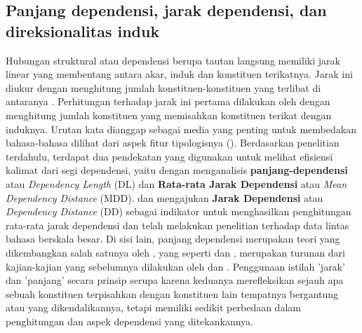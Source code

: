\subsection{Panjang dependensi, jarak dependensi, dan direksionalitas induk}

Hubungan struktural atau dependensi berupa tautan langsung memiliki jarak linear yang membentang antara akar, induk dan konstituen terikatnya. Jarak ini diukur dengan menghitung jumlah konstituen-konstituen yang terlibat di antaranya \citep{heringer1980syntax}. Perhitungan terhadap jarak ini pertama dilakukan oleh \cite{heringer1980syntax} dengan menghitung jumlah konstituen yang memisahkan konstituen terikat dengan induknya. Urutan kata dianggap sebagai media yang penting untuk membedakan bahasa-bahasa dilihat dari aspek fitur tipologisnya (\citealp{greenberg1963some, dryer1992greenbergian}). Berdasarkan penelitian terdahulu, terdapat dua pendekatan yang digunakan untuk melihat efisiensi kalimat dari segi dependensi, yaitu dengan menganalisis \textbf{\Gls{panjang-dependensi}} atau \textit{Dependency Length} (DL) dan \textbf{Rata-rata Jarak Dependensi} atau \textit{Mean Dependency Distance} (MDD). \cite{liu2008dependency} dan \cite{liu2017dependency} mengajukan \textbf{Jarak Dependensi} atau \textit{Dependency Distance} (DD) sebagai indikator untuk menghasilkan penghitungan rata-rata jarak dependensi dan telah melakukan penelitian terhadap data lintas bahasa berskala besar. Di sisi lain, panjang dependensi merupakan teori yang dikembangkan salah satunya oleh \cite{gildea2010grammars}, yang seperti \cite{liu2008dependency} dan \cite{liu2017dependency}, merupakan turunan dari kajian-kajian yang sebelumnya dilakukan oleh \citet{gibson1998linguistic, gibson2000dependency} dan \cite{hawkins1994performance}. Penggunaan istilah 'jarak' dan 'panjang' secara prinsip serupa karena keduanya merefleksikan sejauh apa sebuah konstituen terpisahkan dengan konstituen lain tempatnya bergantung atau yang dikendalikannya, tetapi memiliki sedikit perbedaan dalam penghitungan dan aspek dependensi yang ditekankannya. 

